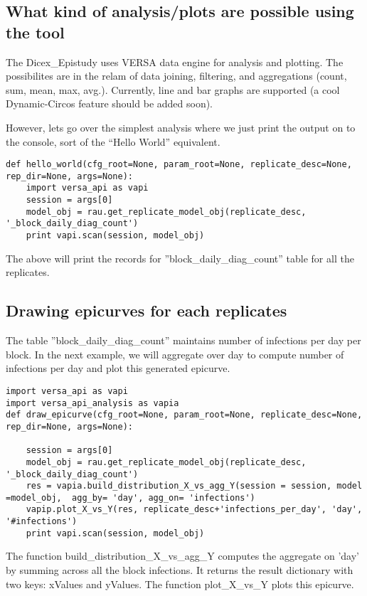 \documentclass[11]{report}
\begin{document}
\subsection{What kind of analysis/plots are possible using the tool}
The Dicex\_Epistudy uses VERSA data engine for analysis and plotting. The possibilites are in the relam of data joining, filtering, and aggregations (count, sum, mean, max, avg.). Currently, line and bar graphs are supported (a cool Dynamic-Circos feature should be added soon).

However, lets go over the simplest analysis where we just print the output on to the console, sort of the ``Hello World'' equivalent. 

\begin{verbatim}
def hello_world(cfg_root=None, param_root=None, replicate_desc=None, rep_dir=None, args=None):
    import versa_api as vapi
    session = args[0]
    model_obj = rau.get_replicate_model_obj(replicate_desc, '_block_daily_diag_count') 
    print vapi.scan(session, model_obj)
\end{verbatim}

The above will print the records for ''block\_daily\_diag\_count'' table for all the replicates. 

\subsection{Drawing epicurves for each replicates}
The table ''block\_daily\_diag\_count'' maintains number of infections per day per block. 
In the next example, we will aggregate over day to compute number of infections per day and plot this generated epicurve. 

\begin{verbatim}
import versa_api as vapi
import versa_api_analysis as vapia
def draw_epicurve(cfg_root=None, param_root=None, replicate_desc=None, rep_dir=None, args=None):

    session = args[0]
    model_obj = rau.get_replicate_model_obj(replicate_desc, '_block_daily_diag_count') 
    res = vapia.build_distribution_X_vs_agg_Y(session = session, model =model_obj,  agg_by= 'day', agg_on= 'infections')
    vapip.plot_X_vs_Y(res, replicate_desc+'infections_per_day', 'day', '#infections')
    print vapi.scan(session, model_obj)
\end{verbatim}
The function build\_distribution\_X\_vs\_agg\_Y computes the aggregate on 'day' by summing across all the block infections. It returns the result dictionary with two keys: xValues and yValues. 
The function plot\_X\_vs\_Y plots this epicurve. 
\end{document}
